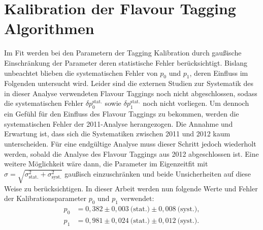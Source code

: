 \section{Kalibration der Flavour Tagging Algorithmen} \label{kap:syst_tagging}
Im Fit werden bei den Parametern der Tagging Kalibration durch gaußische Einschränkung der Parameter deren statistische Fehler berücksichtigt. Bislang unbeachtet blieben die systematischen Fehler von $p_0$ und $p_1$, deren Einfluss im Folgenden untersucht wird. Leider sind die externen Studien zur Systematik des in dieser Analyse verwendeten Flavour Taggings noch nicht abgeschlossen, sodass die systematischen Fehler $\delta p_0^{\text{stat.}}$ sowie $\delta p_1^{\text{stat.}}$ noch nicht vorliegen. Um dennoch ein Gefühl für den Einfluss des Flavour Taggings zu bekommen, werden die systematischen Fehler der 2011-Analyse \cite{lhcb-paper} herangezogen. Die Annahme und Erwartung ist, dass sich die Systematiken zwischen 2011 und 2012 kaum unterscheiden. Für eine endgültige Analyse muss dieser Schritt jedoch wiederholt werden, sobald die Analyse des Flavour Taggings aus 2012 abgeschlossen ist. Eine weitere Möglichkeit wäre dann, die Parameter im Eigenzeitfit mit $\sigma = \sqrt{\sigma_{\text{stat.}}^2+\sigma_{\text{syst.}}^2}$ gaußisch einzuschränken und beide Unsicherheiten auf diese Weise zu berücksichtigen. In dieser Arbeit werden nun folgende Werte und Fehler der Kalibrationsparameter $p_0$ und $p_1$ verwendet:
\begin{align}
p_0 &= 0,382 \pm 0,003\ \text{(stat.)} \pm 0,008\ \text{(syst.)}, \\
p_1 &= 0,981 \pm 0,024\ \text{(stat.)} \pm 0,012\ \text{(syst.)}.
\end{align}

